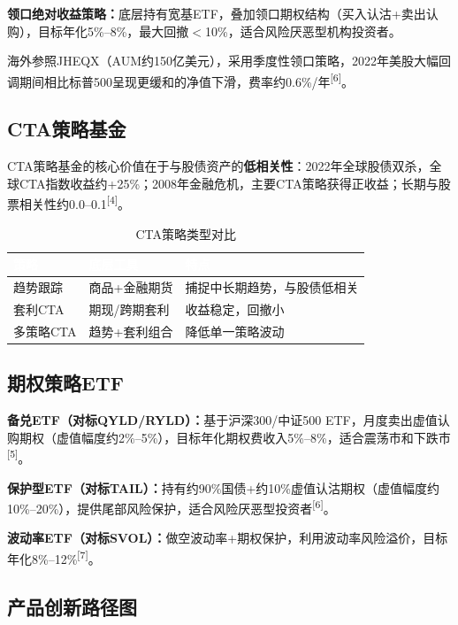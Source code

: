 \documentclass[10pt,a4paper,twocolumn]{ctexart}
\begin{document}
\textbf{领口绝对收益策略：}底层持有宽基ETF，叠加领口期权结构（买入认沽+卖出认购），目标年化5\%--8\%，最大回撤$<$10\%，适合风险厌恶型机构投资者。

海外参照JHEQX（AUM约150亿美元），采用季度性领口策略，2022年美股大幅回调期间相比标普500呈现更缓和的净值下滑，费率约0.6\%/年\textsuperscript{[6]}。

\subsection{CTA策略基金}

CTA策略基金的核心价值在于与股债资产的\textbf{低相关性}：2022年全球股债双杀，全球CTA指数收益约+25\%；2008年金融危机，主要CTA策略获得正收益；长期与股票相关性约0.0--0.1\textsuperscript{[4]}。

\begin{table}[H]
\centering\scriptsize
\caption{CTA策略类型对比}
\label{tab:cta}
\renewcommand{\arraystretch}{1.25}
\setlength{\tabcolsep}{3pt}
\begin{tabularx}{\columnwidth}{@{}L{1.5cm}L{1.8cm}X@{}}
\toprule
{}
\textcolor{white}{\textbf{策略}} &
\textcolor{white}{\textbf{底层工具}} &
\textcolor{white}{\textbf{特点}} \\
\midrule
趋势跟踪 & 商品+金融期货 & 捕捉中长期趋势，与股债低相关 \\
套利CTA  & 期现/跨期套利 & 收益稳定，回撤小 \\
多策略CTA & 趋势+套利组合 & 降低单一策略波动 \\
\bottomrule
\end{tabularx}
\end{table}

\subsection{期权策略ETF}

\textbf{备兑ETF（对标QYLD/RYLD）：}基于沪深300/中证500 ETF，月度卖出虚值认购期权（虚值幅度约2\%--5\%），目标年化期权费收入5\%--8\%，适合震荡市和下跌市\textsuperscript{[5]}。

\textbf{保护型ETF（对标TAIL）：}持有约90\%国债+约10\%虚值认沽期权（虚值幅度约10\%--20\%），提供尾部风险保护，适合风险厌恶型投资者\textsuperscript{[6]}。

\textbf{波动率ETF（对标SVOL）：}做空波动率+期权保护，利用波动率风险溢价，目标年化8\%--12\%\textsuperscript{[7]}。

\subsection{产品创新路径图}
\end{document}
